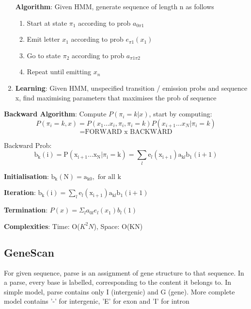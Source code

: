 \documentclass{article}
\begin{document}
\begin{enumerate}
\begin{itemize}
\begin{enumerate}
        \end{enumerate}
    \end{itemize}
    
    \textbf{Algorithm}: Given HMM, generate sequence of length n as follows
    \begin{enumerate}
        \item Start at state $\pi_1$ according to prob $a_{0\pi 1}$
        \item Emit letter $x_1$ according to prob $e_{\pi 1}(x_1)$
        \item Go to state $\pi_2$ according to prob $a_{\pi 1 \pi 2}$
        \item Repeat until emitting $x_n$
    \end{enumerate}
    
    
    \item \textbf{Learning}: Given HMM, unspecified transition / emission probs and sequence x, find maximising parameters that maximises the prob of sequence
\end{enumerate}

\textbf{Backward Algorithm}: Compute $P(\pi_i = k | x)$, start by computing:
$$
P(\pi_{i}=k, x) = P\left(x_{1} \ldots x_{i}, \pi_{i}, \pi_{i}=k\right)  P(x_{i+1} \ldots x_{N} | \pi_{i}=k)
$$
$$ = \text{FORWARD x BACKWARD}$$

Backward Prob:
$$\mathrm{b}_{\mathrm{k}}(\mathrm{i})=\mathrm{P}(\mathrm{x}_{\mathrm{i}+1} \ldots \mathrm{x}_{\mathrm{N}} | \pi_{\mathrm{i}}=\mathrm{k}) = \sum_{l} \mathrm{e}_{l}(\mathrm{x}_{\mathrm{i}+1}) \mathrm{a}_{\mathrm{k} l} \mathrm{b}_{1}(\mathrm{i}+1)$$

\textbf{Initialisation}: $\mathrm{b}_{\mathrm{k}}(\mathrm{N})=\mathrm{a}_{\mathrm{k} 0}, \text { for all } \mathrm{k}$

\textbf{Iteration}: $\mathrm{b}_{\mathrm{k}}(\mathrm{i})=\sum_{l} \mathrm{e}_{l}\left(\mathrm{x}_{\mathrm{i}+1}\right) \mathrm{a}_{\mathrm{k} l} \mathrm{b}_{1}(\mathrm{i}+1)$

\textbf{Termination}: $P(x)=\Sigma_{l} a_{0l} e_{l}\left(x_{1}\right) b_{l}(1)$

\textbf{Complexities}: Time: O($K^2 N$), Space: O(KN)

\subsection{GeneScan}
For given sequence, parse is an assignment of gene structure to that sequence. In a parse, every base is labelled, corresponding to the content it belongs to. In simple model, parse contains only I (intergenic) and G (gene). More complete model contains '-' for intergenic, 'E' for exon and 'I' for intron
\end{document}
